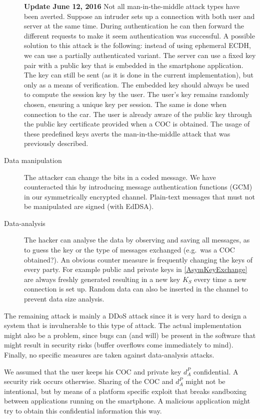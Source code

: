 \begin{description}
  \textbf{Update June 12, 2016} Not all man-in-the-middle attack types have been averted. Suppose an intruder sets up a connection with both user and server at the same time. During authentication he can then forward the different requests to make it seem authentication was successful. A possible solution to this attack is the following: instead of using ephemeral ECDH, we can use a partially authenticated variant. The server can use a fixed key pair with a public key that is embedded in the smartphone application. The key can still be sent (as it is done in the current implementation), but only as a means of verification. The embedded key should always be used to compute the session key by the user. The user's key remains randomly chosen, ensuring a unique key per session. The same is done when connection to the car. The user is already aware of the public key through the public key certificate provided when a COC is obtained. The usage of these predefined keys averts the man-in-the-middle attack that was previously described.
  \item[Data manipulation] The attacker can change the bits in a coded message. We have counteracted this by introducing message authentication functions (GCM) in our symmetrically encrypted channel. Plain-text messages that must not be manipulated are signed (with EdDSA).
  \item[Data-analysis] The hacker can analyse the data by observing and saving all messages, as to guess the key or the type of messages exchanged (e.g.\ was a COC obtained?). An obvious counter measure is frequently changing the keys of every party. For example public and private keys in \cref{AsymKeyExchange} are always freshly generated resulting in a new key $K_S$ every time a new connection is set up. Random data can also be inserted in the channel to prevent data size analysis.
\end{description}

The remaining attack is mainly a DDoS attack since it is very hard to design a system that is invulnerable to this type of attack. The actual implementation might also be a problem, since bugs can (and will) be present in the software that might result in security risks (buffer overflows come immediately to mind). Finally, no specific measures are taken against data-analysis attacks.

We assumed that the user keeps his COC and private key $d_A^P$ confidential. A security risk occurs otherwise. Sharing of the COC and $d_A^P$ might not be intentional, but by means of a platform specific exploit that breaks sandboxing between applications running on the smartphone. A malicious application might try to obtain this confidential information this way.
